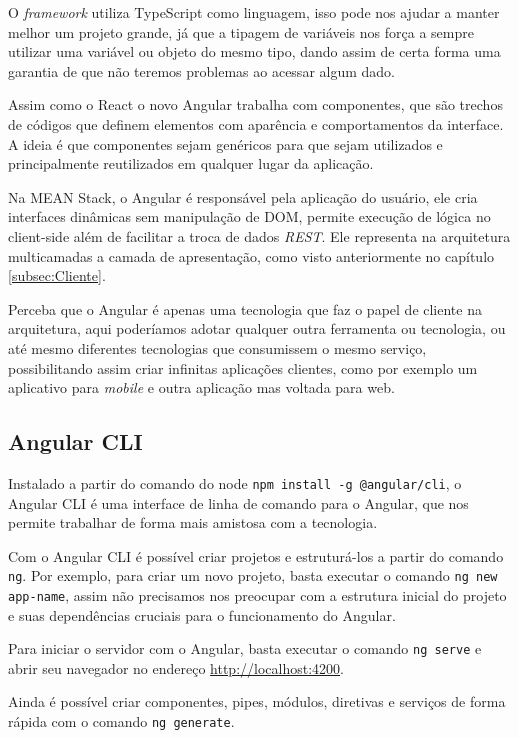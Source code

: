\documentclass[
	12pt,				%
	openright,			%
	twoside,			%
	a4paper,			%
	english,			%
	brazil				%
	]{abntex2}
\begin{document}
O \textit{framework} utiliza TypeScript como linguagem, isso pode nos ajudar a manter melhor um projeto grande, já que a tipagem de variáveis nos força a sempre utilizar uma variável ou objeto do mesmo tipo, dando assim de certa forma uma garantia de que não teremos problemas ao acessar algum dado.

Assim como o React o novo Angular trabalha com componentes, que são trechos de códigos que definem elementos com aparência e comportamentos da interface. A ideia é que componentes sejam genéricos para que sejam utilizados e principalmente reutilizados em qualquer lugar da aplicação.

Na MEAN Stack, o Angular é responsável pela aplicação do usuário, ele cria interfaces dinâmicas sem manipulação de DOM, permite execução de lógica no client-side além de facilitar a troca de dados \textit{REST}. Ele representa na arquitetura multicamadas a camada de apresentação, como visto anteriormente no capítulo \ref{subsec:Cliente}.

Perceba que o Angular é apenas uma tecnologia que faz o papel de cliente na arquitetura, aqui poderíamos adotar qualquer outra ferramenta ou tecnologia, ou até mesmo diferentes tecnologias que consumissem o mesmo serviço, possibilitando assim criar infinitas aplicações clientes, como por exemplo um aplicativo para \textit{mobile} e outra aplicação mas voltada para web.

\subsection{Angular CLI} 

Instalado a partir do comando do node \verb|npm install -g @angular/cli|, o Angular CLI é uma interface de linha de comando para o Angular, que nos permite trabalhar de forma mais amistosa com a tecnologia.

Com o Angular CLI é possível criar projetos e estruturá-los a partir do comando \verb|ng|. Por exemplo, para criar um novo projeto, basta executar o comando \verb|ng new app-name|, assim não precisamos nos preocupar com a estrutura inicial do projeto e suas dependências cruciais para o funcionamento do Angular. 

Para iniciar o servidor com o Angular, basta executar o comando \verb|ng serve| e abrir seu navegador no endereço \href{http://localhost:4200}{http://localhost:4200}.

Ainda é possível criar componentes, pipes, módulos, diretivas e serviços de forma rápida com o comando \verb|ng generate|.
\end{document}
